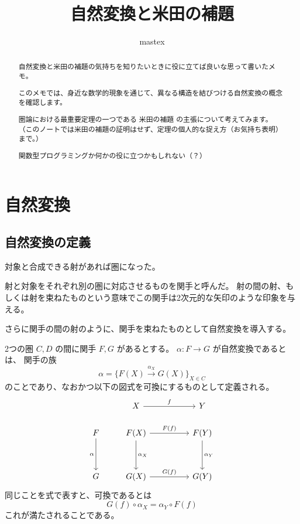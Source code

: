 \documentclass[uplatex,a4j,12pt,dvipdfmx]{jsarticle}
\title{
自然変換と米田の補題
}
\author{
mastex
}
\begin{document}
\maketitle

\begin{abstract}
	自然変換と米田の補題の気持ちを知りたいときに役に立てば良いな思って書いたメモ。

	このメモでは、身近な数学的現象を通じて、異なる構造を結びつける自然変換の概念を確認します。

	圏論における最重要定理の一つである $\textbf{米田の補題}$ の主張について考えてみます。
	（このノートでは米田の補題の証明はせず、定理の個人的な捉え方（お気持ち表明）まで。）

	関数型プログラミングか何かの役に立つかもしれない（？）


\end{abstract}

\section{自然変換}

\subsection{自然変換の定義}

対象と合成できる射があれば圏になった。

射と対象をそれぞれ別の圏に対応させるものを関手と呼んだ。
射の間の射、もしくは射を束ねたものという意味でこの関手は2次元的な矢印のような印象を与える。

さらに関手の間の射のように、関手を束ねたものとして自然変換を導入する。

2つの圏 $C,D$ の間に関手 $F,G$ があるとする。
$\alpha : F \to G$ が自然変換であるとは、
関手の族
$$\alpha = \Big\{ F(X) \xrightarrow{\alpha_{X}}G(X) \Big\}_{X \in C}$$
のことであり、なおかつ以下の図式を可換にするものとして定義される。
\[
	\begin{tikzcd}
		& X \arrow[rr, "f"]                                &  & Y                             \\
		F \arrow[dd, "\alpha"'] & F(X) \arrow[rr, "F(f)"] \arrow[dd, "\alpha_{X}"] &  & F(Y) \arrow[dd, "\alpha_{Y}"] \\
		&                                                  &  &                               \\
		G                       & G(X) \arrow[rr, "G(f)"]                          &  & G(Y)
	\end{tikzcd}
\]
同じことを式で表すと、可換であるとは
$$
	G(f) \circ \alpha_{X} = \alpha_{Y} \circ F(f)
$$
これが満たされることである。
\end{document}
